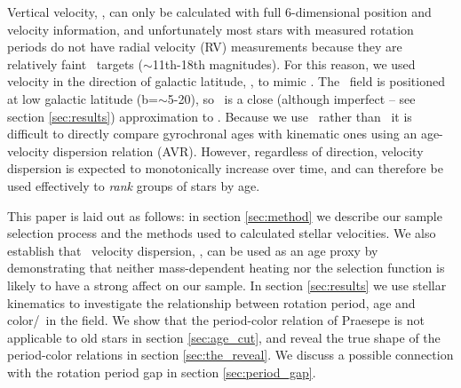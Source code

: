 Vertical velocity, \vz, can only be calculated with full 6-dimensional
position and velocity information, and unfortunately most stars with measured
rotation periods do not have radial velocity (RV) measurements because they
are relatively faint \kepler\ targets ($\sim$11th-18th magnitudes).
For this reason, we used velocity in the direction of galactic latitude, \vb,
to mimic \vz.
The \kepler\ field is positioned at low galactic latitude
(b=$\sim$5-20\degrees), so \vb\ is a close (although imperfect -- see section
\ref{sec:results}) approximation to \vz.
Because we use \vb\ rather than \vz\, it is difficult to directly compare
gyrochronal ages with kinematic ones using an age-velocity dispersion relation
(AVR).
However, regardless of direction, velocity dispersion is expected to
monotonically increase over time, and can therefore be used effectively to
{\it rank} groups of stars by age.

This paper is laid out as follows: in section \ref{sec:method} we describe our
sample selection process and the methods used to calculated stellar
velocities.
We also establish that \vb\ velocity dispersion, \sigmavb, can be used as an
age proxy by demonstrating that neither mass-dependent heating nor the
selection function is likely to have a strong affect on our sample.
In section \ref{sec:results} we use stellar kinematics to investigate the
relationship between rotation period, age and color/\teff\ in the field.
We show that the period-color relation of Praesepe is not applicable to
old stars in section \ref{sec:age_cut}, and reveal the true shape of the
period-color relations in section \ref{sec:the_reveal}.
We discuss a possible connection with the rotation period gap in section
\ref{sec:period_gap}.


